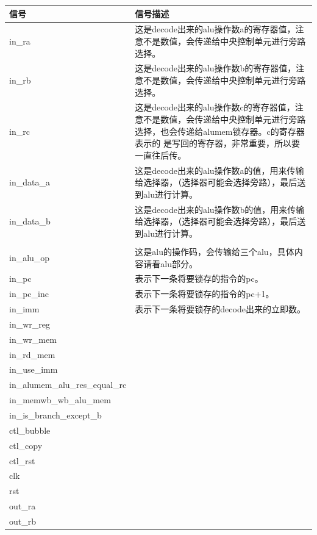 \begin{center}
    \begin{tabular}{|p{3.5cm}|p{11cm}|}
        \hline 信号 & 信号描述 \\
        \hline in\_ra  & 这是decode出来的alu操作数a的寄存器值，注意不是数值，会传递给中央控制单元进行旁路选择。 \\
        \hline in\_rb &  这是decode出来的alu操作数b的寄存器值，注意不是数值，会传递给中央控制单元进行旁路选择。\\
        \hline in\_rc &  这是decode出来的alu操作数c的寄存器值，注意不是数值，会传递给中央控制单元进行旁路选择，也会传递给alumem锁存器。c的寄存器表示的
        是写回的寄存器，非常重要，所以要一直往后传。\\
        \hline in\_data\_a &  这是decode出来的alu操作数a的值，用来传输给选择器，（选择器可能会选择旁路），最后送到alu进行计算。 \\
        \hline in\_data\_b &  这是decode出来的alu操作数b的值，用来传输给选择器，（选择器可能会选择旁路），最后送到alu进行计算。 \\\\
        \hline in\_alu\_op &  这是alu的操作码，会传输给三个alu，具体内容请看alu部分。\\
        \hline in\_pc &  表示下一条将要锁存的指令的pc。\\
        \hline in\_pc\_inc &  表示下一条将要锁存的指令的pc+1。\\
        \hline in\_imm &  表示下一条将要锁存的decode出来的立即数。\\
        \hline in\_wr\_reg &  \\
        \hline in\_wr\_mem &  \\
        \hline in\_rd\_mem &  \\
        \hline in\_use\_imm &  \\
        \hline in\_alumem\_alu\_res\_equal\_rc &  \\
        \hline in\_memwb\_wb\_alu\_mem &  \\
        \hline in\_is\_branch\_except\_b &  \\
        \hline ctl\_bubble &  \\
        \hline ctl\_copy &  \\
        \hline ctl\_rst &  \\
        \hline clk &  \\
        \hline rst &  \\
        \hline out\_ra &  \\
        \hline out\_rb &  \\

\end{tabular}
\end{center}
